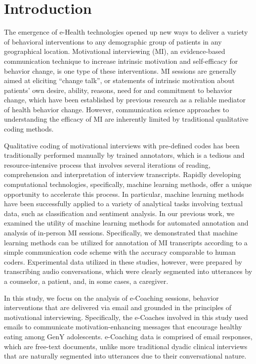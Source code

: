 \documentclass{amia}
\begin{document}
\section*{Introduction}
The emergence of e-Health technologies opened up new ways to deliver a variety of behavioral interventions to any demographic group of patients in any geographical location. Motivational interviewing (MI), an evidence-based communication technique to increase intrinsic motivation and self-efficacy for behavior change\cite{miller2012motivational,miller2009ten,miller2009toward}, is one type of these interventions. MI sessions are generally aimed at eliciting ``change talk'', or statements of intrinsic motivation about patients' own desire, ability, reasons, need for and commitment to behavior change, which have been established by previous research\cite{apodaca2009mechanisms} as a reliable mediator of health behavior change. However, communication science approaches to understanding the efficacy of MI are inherently limited by traditional qualitative coding methods. 

Qualitative coding of motivational interviews with pre-defined codes has been traditionally performed manually by trained annotators, which is a tedious and resource-intensive process that involves several iterations of reading, comprehension and interpretation of interview transcripts. Rapidly developing computational technologies, specifically, machine learning methods, offer a unique opportunity to accelerate this process. In particular, machine learning methods have been successfully applied to a variety of analytical tasks involving textual data, such as classification\cite{nigam2000text} and sentiment analysis\cite{wang2012baselines}. In our previous work, we examined the utility of machine learning methods for automated annotation \cite{hasan2016study,kotov2015interpretable} and analysis \cite{hasan2018predicting} of in-person MI sessions. Specifically, we demonstrated that machine learning methods can be utilized for annotation of MI transcripts according to a simple communication code scheme with the accuracy comparable to human coders\cite{hasan2016study}. Experimental data utilized in these studies, however, were prepared by transcribing audio conversations, which were clearly segmented into utterances by a counselor, a patient, and, in some cases, a caregiver. 

In this study, we focus on the analysis of e-Coaching sessions, behavior interventions that are delivered via email and grounded in the principles of motivational interviewing. Specifically, the e-Coaches involved in this study used emails to communicate motivation-enhancing messages that encourage healthy eating among GenY adolescents. e-Coaching data is comprised of email responses, which are free-text documents, unlike more traditional dyadic clinical interviews that are naturally segmented into utterances due to their conversational nature.
\end{document}
